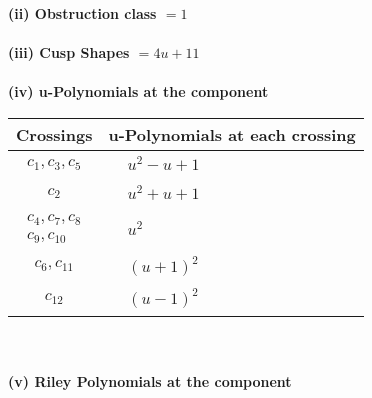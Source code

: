 \documentclass[1p]{elsarticle_modified}
\theoremstyle{definition}
\begin{document}
\flushleft \textbf{(ii) Obstruction class $= 1$}\\~\\
\flushleft \textbf{(iii) Cusp Shapes $= 4 u+11$}\\~\\
\newpage\renewcommand{\arraystretch}{1}
\flushleft \textbf{(iv) u-Polynomials at the component}\newline \\
\begin{tabular}{m{50pt}|m{274pt}}
Crossings & \hspace{64pt}u-Polynomials at each crossing \\
\hline $$\begin{aligned}c_{1},c_{3},c_{5}\end{aligned}$$&$\begin{aligned}
&u^2- u+1
\end{aligned}$\\
\hline $$\begin{aligned}c_{2}\end{aligned}$$&$\begin{aligned}
&u^2+u+1
\end{aligned}$\\
\hline $$\begin{aligned}c_{4},c_{7},c_{8}\\c_{9},c_{10}\end{aligned}$$&$\begin{aligned}
&u^2
\end{aligned}$\\
\hline $$\begin{aligned}c_{6},c_{11}\end{aligned}$$&$\begin{aligned}
&(u+1)^2
\end{aligned}$\\
\hline $$\begin{aligned}c_{12}\end{aligned}$$&$\begin{aligned}
&(u-1)^2
\end{aligned}$\\
\hline
\end{tabular}\\~\\
\newpage\renewcommand{\arraystretch}{1}
\flushleft \textbf{(v) Riley Polynomials at the component}\newline \\
\end{document}
